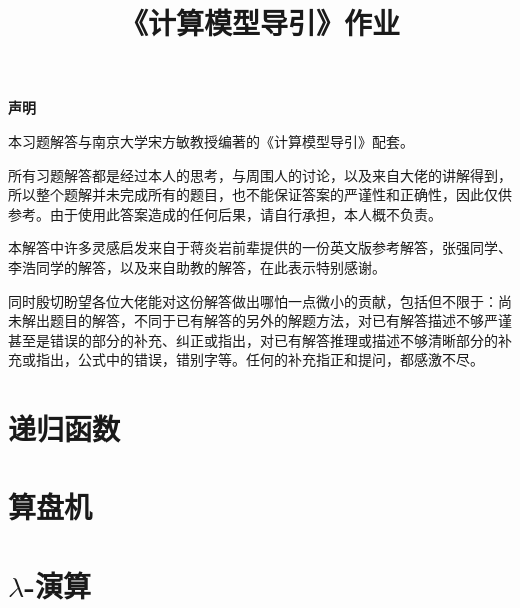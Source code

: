 \documentclass[a4paper,twoside]{article}
\title{\bf 《计算模型导引》作业}
\author{}
\date{}
\begin{document}
\begin{titlepage}
\maketitle
\thispagestyle{empty}
\end{titlepage}
\begin{center}
\bf\LARGE 声明
\end{center}

本习题解答与南京大学宋方敏教授编著的《计算模型导引》配套。

所有习题解答都是经过本人的思考，与周围人的讨论，以及来自大佬的讲解得到，所以整个题解并未完成所有的题目，也不能保证答案的严谨性和正确性，因此仅供参考。由于使用此答案造成的任何后果，请自行承担，本人概不负责。

本解答中许多灵感启发来自于蒋炎岩前辈提供的一份英文版参考解答，张强同学、李浩同学的解答，以及来自助教的解答，在此表示特别感谢。

同时殷切盼望各位大佬能对这份解答做出哪怕一点微小的贡献，包括但不限于：尚未解出题目的解答，不同于已有解答的另外的解题方法，对已有解答描述不够严谨甚至是错误的部分的补充、纠正或指出，对已有解答推理或描述不够清晰部分的补充或指出，公式中的错误，错别字等。任何的补充指正和提问，都感激不尽。
\thispagestyle{empty}
\newpage
\thispagestyle{empty}
\setcounter{page}{1}
\section{递归函数}

























\newpage
\section{算盘机}





\newpage
\section{$\lambda$-演算}

























\newpage
\end{document}
